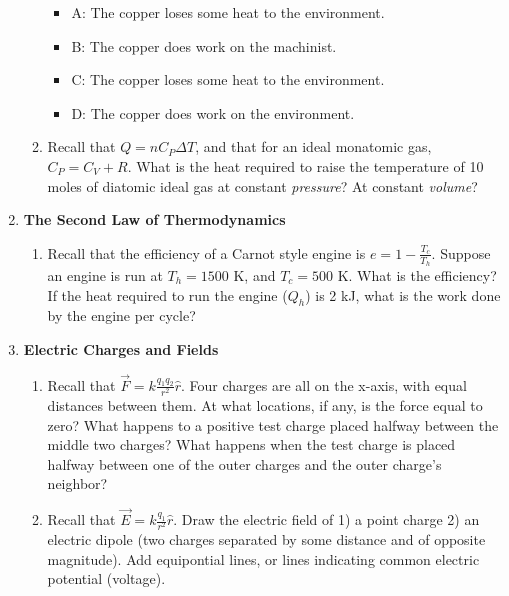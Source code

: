 \documentclass[10pt]{article}
\begin{document}
\begin{enumerate}
\begin{enumerate}
\begin{itemize}
\item A: The copper loses some heat to the environment.
\item B: The copper does work on the machinist.
\item C: The copper loses some heat to the environment.
\item D: The copper does work on the environment.
\end{itemize}
\item Recall that $Q = n C_P \Delta T$, and that for an ideal monatomic gas, $C_P = C_V + R$.  What is the heat required to raise the temperature of 10 moles of diatomic ideal gas at constant \textit{pressure}?  At constant \textit{volume}? \\ \vspace{3cm}
\end{enumerate}
\item \textbf{The Second Law of Thermodynamics}
\begin{enumerate}
\item Recall that the efficiency of a Carnot style engine is $e = 1-\frac{T_c}{T_h}$.  Suppose an engine is run at $T_h = 1500$ K, and $T_c = 500$ K.  What is the efficiency?  If the heat required to run the engine ($Q_h$) is 2 kJ, what is the work done by the engine per cycle?  \\ \vspace{3cm}
\end{enumerate}
\item \textbf{Electric Charges and Fields}
\begin{enumerate}
\item Recall that $\vec{F} = k \frac{q_1 q_2}{r^2}\hat{r}$.  Four charges are all on the x-axis, with equal distances between them.  At what locations, if any, is the force equal to zero?  What happens to a positive test charge placed halfway between the middle two charges?  What happens when the test charge is placed halfway between one of the outer charges and the outer charge's neighbor? \\ \vspace{4cm}
\item Recall that $\vec{E} = k \frac{q_1}{r^2}\hat{r}$.  Draw the electric field of 1) a point charge 2) an electric dipole (two charges separated by some distance and of opposite magnitude).  Add equipontial lines, or lines indicating common electric potential (voltage). \\ \vspace{5cm}

\end{enumerate}
\end{enumerate}
\end{document}
